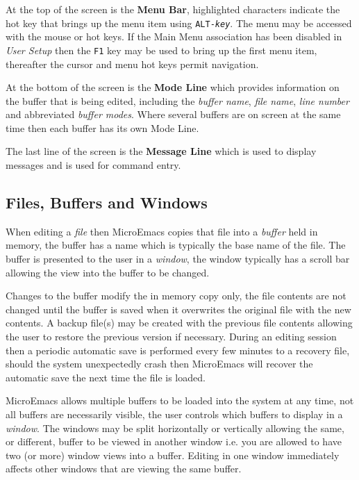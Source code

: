 \documentclass[11pt,a4paper,pdftex]{article}
\begin{document}
  At the top of the screen is the \textbf{Menu Bar}, highlighted characters
  indicate the hot key that brings up the menu item using
  \texttt{ALT-\textit{key}}. The menu may be accessed with the mouse or hot
  keys. If the Main Menu association has been disabled in \textit{User Setup}
  then the \texttt{F1} key may be used to bring up the first menu item,
  thereafter the cursor and menu hot keys permit navigation.

  At the bottom of the screen is the \textbf{Mode Line} which provides
  information on the buffer that is being edited, including the \textit{buffer
  name}, \textit{file name}, \textit{line number} and abbreviated
  \textit{buffer modes}. Where several buffers are on screen at the same time
  then each buffer has its own Mode Line.

  The last line of the screen is the \textbf{Message Line} which is used to
  display messages and is used for command entry.

\subsection{Files, Buffers and Windows}

  When editing a \textit{file} then MicroEmacs copies that file into a
  \textit{buffer} held in memory, the buffer has a name which is typically the
  base name of the file. The buffer is presented to the user in a
  \textit{window}, the window typically has a scroll bar allowing the view
  into the buffer to be changed.

  Changes to the buffer modify the in memory copy only, the file contents are
  not changed until the buffer is saved when it overwrites the original file
  with the new contents. A backup file(s) may be created with the previous
  file contents allowing the user to restore the previous version if
  necessary. During an editing session then a periodic automatic save is
  performed every few minutes to a recovery file, should the system
  unexpectedly crash then MicroEmacs will recover the automatic save the next
  time the file is loaded.

  MicroEmacs allows multiple buffers to be loaded into the system at any time,
  not all buffers are necessarily visible, the user controls which buffers to
  display in a \textit{window}. The windows may be split horizontally or
  vertically allowing the same, or different, buffer to be viewed in another
  window i.e. you are allowed to have two (or more) window views into a
  buffer. Editing in one window immediately affects other windows that are
  viewing the same buffer.
\end{document}
